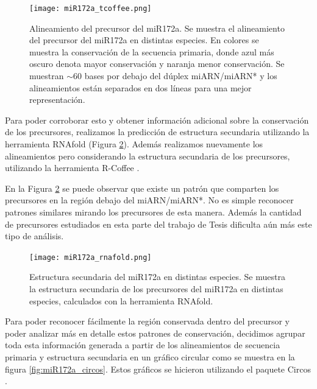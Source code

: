 \begin{landscape}
    \begin{figure}[htbp!] 
        \centering    
        \texttt{[image: miR172a\_tcoffee.png]}
        \caption[Alineamiento del precursor del miR172a.]{Alineamiento del precursor del miR172a. 
        Se muestra el alineamiento del precursor del miR172a en distintas especies. 
        En colores se muestra la conservación de la secuencia primaria, donde azul más oscuro denota mayor conservación y naranja menor conservación.
        Se muestran $\sim$60 bases por debajo del dúplex miARN/miARN* y los alineamientos están separados en dos líneas para una mejor representación.}
         \label{fig:miR172a_tcoffee}
    \end{figure}
\end{landscape}

Para poder corroborar esto y obtener información adicional sobre la conservación de los precursores, realizamos la predicción de estructura secundaria utilizando la herramienta RNAfold \citep{pmid22115189} (Figura \ref{fig:miR172a_rnafold}).
Además realizamos nuevamente los alineamientos pero considerando la estructura secundaria de los precursores, utilizando la herramienta R-Coffee \citep{pmid18292307}.

En la Figura \ref{fig:miR172a_rnafold} se puede observar que existe un patrón que comparten los precursores en la región debajo del miARN/miARN*.
No es simple reconocer patrones similares mirando los precursores de esta manera.
Además la cantidad de precursores estudiados en esta parte del trabajo de Tesis dificulta aún más este tipo de análisis.

\begin{landscape}
    \begin{figure}[htbp!] 
        \centering    
        \texttt{[image: miR172a\_rnafold.png]}
        \caption[Estructura secundaria del miR172a en distintas especies]{
        Estructura secundaria del miR172a en distintas especies.
        Se muestra la estructura secundaria de los precursores del miR172a en distintas especies, calculados con la herramienta RNAfold.
        }
        \label{fig:miR172a_rnafold}
    \end{figure}
\end{landscape}

Para poder reconocer fácilmente la región conservada dentro del precursor y poder analizar más en detalle estos patrones de conservación, decidimos agrupar toda esta información
 generada a partir de los alineamientos de secuencia primaria y estructura secundaria en un gráfico circular como se muestra en la figura \ref{fig:miR172a_circos}.
Estos gráficos se hicieron utilizando el paquete Circos \citep{pmid19541911}.
 
